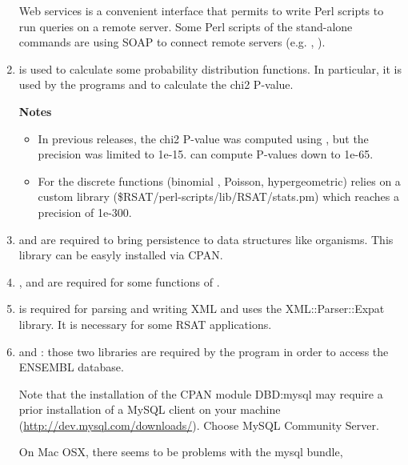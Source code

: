 \begin{enumerate}
  \RSAT Web services is a convenient interface that permits to write
  Perl scripts to run \RSAT queries on a remote server. Some Perl
  scripts of the \RSAT stand-alone commands are using SOAP to connect
  remote servers (e.g. ,
  ).

\item {} is used to calculate some
  probability distribution functions. In particular, it is used by the
  programs  and  to
  calculate the chi2 P-value.

  \textbf{Notes} 
  \begin{itemize}
  \item In previous releases, the chi2 P-value was computed using
    , but the precision was limited to
    1e-15.  can compute P-values
    down to 1e-65.
  \item For the discrete functions (binomial , Poisson,
    hypergeometric) \RSAT relies on a custom library
    (\$RSAT/perl-scripts/lib/RSAT/stats.pm) which reaches a precision
    of 1e-300.
  \end{itemize}


\item {} and  are required
  to bring persistence to data structures like organisms. This library
  can be easyly installed via CPAN.

\item {},  and 
  are required for some functions of .

\item {} is required for parsing and writing XML and uses
  the XML::Parser::Expat library. It is necessary for some RSAT
  applications.

\item {}  and : those two libraries are
  required by the program  in order to
  access the ENSEMBL database.
  
  Note that the
installation of the CPAN module DBD:mysql may require a prior
installation of a MySQL client on your machine
(\url{http://dev.mysql.com/downloads/}). Choose MySQL Community Server.

On Mac OSX, there seems to be problems with the mysql bundle,


\end{enumerate}
